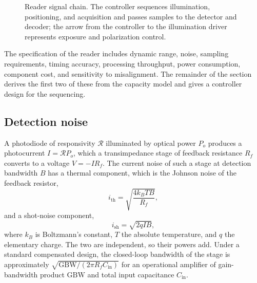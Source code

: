\begin{figure}[h]
\centering
{}
\caption{Reader signal chain. The controller sequences illumination, positioning, and acquisition and passes samples to the detector and decoder; the arrow from the controller to the illumination driver represents exposure and polarization control.}
\label{fig:chain}
\end{figure}

The specification of the reader includes dynamic range, noise, sampling requirements, timing accuracy, processing throughput, power consumption, component cost, and sensitivity to misalignment. The remainder of the section derives the first two of these from the capacity model and gives a controller design for the sequencing.

\subsection{Detection noise}\label{sec:noise}

A photodiode of responsivity $\mathcal R$ illuminated by optical power $P_o$ produces a photocurrent $I=\mathcal R P_o$, which a transimpedance stage of feedback resistance $R_f$ converts to a voltage $V=-IR_f$. The current noise of such a stage at detection bandwidth $B$ has a thermal component, which is the Johnson noise of the feedback resistor,
\[
i_{\mathrm{th}}=\sqrt{\frac{4k_BTB}{R_f}},
\]
and a shot-noise component,
\[
i_{\mathrm{sh}}=\sqrt{2qIB},
\]
where $k_B$ is Boltzmann's constant, $T$ the absolute temperature, and $q$ the elementary charge. The two are independent, so their powers add. Under a standard compensated design, the closed-loop bandwidth of the stage is approximately $\sqrt{\mathrm{GBW}/(2\pi R_fC_{\mathrm{in}})}$ for an operational amplifier of gain-bandwidth product $\mathrm{GBW}$ and total input capacitance $C_{\mathrm{in}}$.

